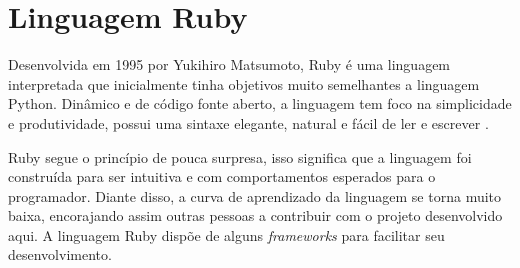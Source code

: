 


\section{Linguagem Ruby}
Desenvolvida em 1995 por Yukihiro Matsumoto, Ruby é uma linguagem interpretada que inicialmente tinha objetivos muito semelhantes a linguagem Python\cite{purer2009phpvspythonvsruby}. Dinâmico e de código fonte aberto, a linguagem tem foco na simplicidade e produtividade, possui uma sintaxe elegante, natural e fácil de ler e escrever \cite{siteruby}. \par
Ruby segue o princípio de pouca surpresa, isso significa que a linguagem foi construída para ser intuitiva e com comportamentos esperados para o programador\cite{purer2009phpvspythonvsruby}. Diante disso, a curva de aprendizado da linguagem se torna muito baixa, encorajando assim outras pessoas a contribuir com o projeto desenvolvido aqui. A linguagem Ruby dispõe de alguns \textit{frameworks} para facilitar seu desenvolvimento.





